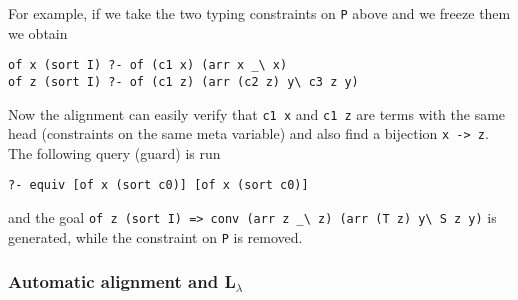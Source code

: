 \documentclass{easychair}
\begin{document}
For example, if we take the two typing constraints on \verb+P+ above
and we freeze them we obtain

\begin{verbatim}
of x (sort I) ?- of (c1 x) (arr x _\ x)
of z (sort I) ?- of (c1 z) (arr (c2 z) y\ c3 z y)
\end{verbatim}

Now the alignment can easily verify that \verb+c1 x+ and \verb+c1 z+
are terms with the same head (constraints on the same meta variable)
and also find a bijection \verb+x -> z+.  The following query (guard)
is run

\begin{verbatim}
?- equiv [of x (sort c0)] [of x (sort c0)]
\end{verbatim}

and the goal \verb+of z (sort I) => conv (arr z _\ z) (arr (T z) y\ S z y)+
is generated, while the constraint on \verb+P+ is removed.

\subsubsection{Automatic alignment and L$_\lambda$}


\label{sec:realchr}
\end{document}
